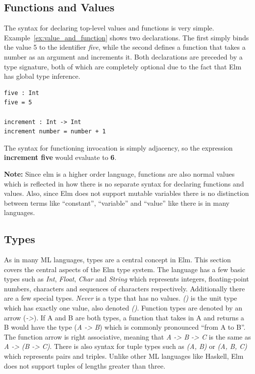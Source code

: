 \documentclass[../thesis.tex]{subfiles}
\begin{document}
\subsection{Functions and Values}
The syntax for declaring top-level values and functions is very simple.
Example~\ref{ex:value_and_function} shows two declarations.
The first simply binds the value 5 to the identifier \textit{five},
while the second defines a function that takes a number as an argument and increments it.
Both declarations are preceded by a type signature, both of which are completely optional
due to the fact that Elm has global type inference.
\begin{example}\label{ex:value_and_function}
\begin{verbatim}
five : Int
five = 5

increment : Int -> Int
increment number = number + 1
\end{verbatim}
\end{example}
The syntax for functioning invocation is simply adjacency, so the expression
\textbf{increment five} would evaluate to \textbf{6}.

\textbf{Note:}
Since elm is a higher order language, functions are also normal values which is reflected
in how there is no separate syntax for declaring functions and values.
Also, since Elm does not support mutable variables there is no distinction
between terms like ``constant'', ``variable'' and ``value'' like there is in many languages.


\subsection{Types}
As in many ML languages, types are a central concept in Elm.
This section covers the central aspects of the Elm type system.
The language has a few basic types such as \textit{Int}, \textit{Float}, \textit{Char} and \textit{String}
which represents integers, floating-point numbers, characters and sequences of characters respectively.
Additionally there are a few special types.
\textit{Never} is a type that has no values.
\textit{()} is the unit type which has exactly one value, also denoted \textit{()}.
Function types are denoted by an arrow (\textit{->}).
If A and B are both types, a function that takes in A and returns a B would have the type (\textit{A -> B})
which is commonly pronounced ``from A to B''.
The function arrow is right associative, meaning that \textit{A -> B -> C} is the same as \textit{A -> (B -> C)}.
There is also syntax for tuple types such as \textit{(A, B)} or \textit{(A, B, C)}
which represents pairs and triples.
Unlike other ML languages like Haskell, Elm does not support tuples of lengths greater than three.
\end{document}
